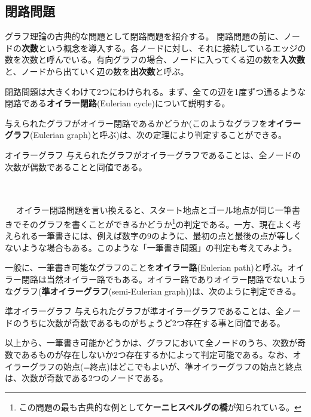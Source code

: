 \subsection{閉路問題}
グラフ理論の古典的な問題として閉路問題を紹介する。
閉路問題の前に、ノードの\textbf{次数}という概念を導入する。各ノードに対し、それに接続しているエッジの数を次数と呼んでいる。有向グラフの場合、ノードに入ってくる辺の数を\textbf{入次数}と、ノードから出ていく辺の数を\textbf{出次数}と呼ぶ。

閉路問題は大きくわけて2つにわけられる。まず、全ての辺を1度ずつ通るような閉路である\textbf{オイラー閉路}(Eulerian cycle)について説明する。

与えられたグラフがオイラー閉路であるかどうか(このようなグラフを\textbf{オイラーグラフ}(Eulerian graph)と呼ぶ)は、次の定理により判定することができる。
\begin{itembox}[l]{オイラーグラフ}
与えられたグラフがオイラーグラフであることは、全ノードの次数が偶数であることと同値である。
\end{itembox}
\\ \\　
オイラー閉路問題を言い換えると、スタート地点とゴール地点が同じ一筆書きでそのグラフを書くことができるかどうか\footnote{この問題の最も古典的な例として\textbf{ケーニヒスベルグの橋}が知られている。}の判定である。一方、現在よく考えられる一筆書きには、例えば数字の9のように、最初の点と最後の点が等しくないような場合もある。このような「一筆書き問題」の判定も考えてみよう。

一般に、一筆書き可能なグラフのことを\textbf{オイラー路}(Eulerian path)と呼ぶ。オイラー閉路は当然オイラー路でもある。オイラー路でありオイラー閉路でないようなグラフ(\textbf{準オイラーグラフ}(semi-Eulerian graph))は、次のように判定できる。
\begin{itembox}[l]{準オイラーグラフ}
与えられたグラフが準オイラーグラフであることは、全ノードのうちに次数が奇数であるものがちょうど2つ存在する事と同値である。
\end{itembox}

以上から、一筆書き可能かどうかは、グラフにおいて全ノードのうち、次数が奇数であるものが存在しないか2つ存在するかによって判定可能である。なお、オイラーグラフの始点(=終点)はどこでもよいが、準オイラーグラフの始点と終点は、次数が奇数である2つのノードである。


